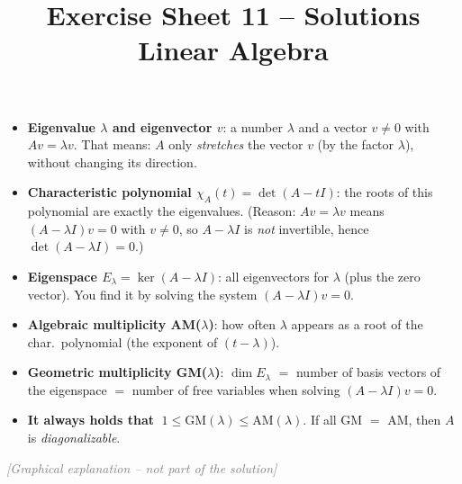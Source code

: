 \documentclass[a4paper,12pt]{article}
\title{Exercise Sheet 11 -- Solutions \\ \large Linear Algebra}
\author{}
\date{}
\newcommand{\grafik}{\textcolor{gray}{\small\textit{[Graphical explanation -- not part of the solution]}}}
\begin{document}
\maketitle

\begin{begriffe}
\begin{itemize}[leftmargin=*, nosep]
    \item \textbf{Eigenvalue $\lambda$ and eigenvector $v$}: a number $\lambda$ and a vector $v \neq 0$ with $A v = \lambda v$. That means: $A$ only \emph{stretches} the vector $v$ (by the factor $\lambda$), without changing its direction.
    \item \textbf{Characteristic polynomial $\chi_A(t) = \det(A - t I)$}: the roots of this polynomial are exactly the eigenvalues. (Reason: $A v = \lambda v$ means $(A - \lambda I) v = 0$ with $v \neq 0$, so $A - \lambda I$ is \emph{not} invertible, hence $\det(A - \lambda I) = 0$.)
    \item \textbf{Eigenspace $E_\lambda = \ker(A - \lambda I)$}: all eigenvectors for $\lambda$ (plus the zero vector). You find it by solving the system $(A - \lambda I) v = 0$.
    \item \textbf{Algebraic multiplicity AM($\lambda$)}: how often $\lambda$ appears as a root of the char.\ polynomial (the exponent of $(t - \lambda)$).
    \item \textbf{Geometric multiplicity GM($\lambda$)}: $\dim E_\lambda$ $=$ number of basis vectors of the eigenspace $=$ number of free variables when solving $(A - \lambda I)v = 0$.
    \item \textbf{It always holds that} $\;1 \le \text{GM}(\lambda) \le \text{AM}(\lambda)$. If all GM $=$ AM, then $A$ is \emph{diagonalizable}.
\end{itemize}
\end{begriffe}

\grafik

\begin{center}
\end{center}
\end{document}
